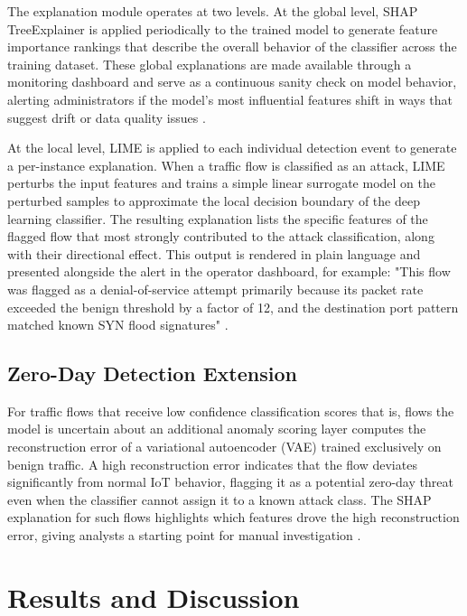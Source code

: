 \documentclass[a4paper,fleqn]{cas-dc}
\numberwithin{equation}{section}
\begin{document}
The explanation module operates at two levels. At the global level, SHAP TreeExplainer is applied periodically to the trained model to generate feature importance rankings that describe the overall behavior of the classifier across the training dataset. These global explanations are made available through a monitoring dashboard and serve as a continuous sanity check on model behavior, alerting administrators if the model's most influential features shift in ways that suggest drift or data quality issues \cite{ieee2024limeshap, ijcrt2025threat}.

At the local level, LIME is applied to each individual detection event to generate a per-instance explanation. When a traffic flow is classified as an attack, LIME perturbs the input features and trains a simple linear surrogate model on the perturbed samples to approximate the local decision boundary of the deep learning classifier. The resulting explanation lists the specific features of the flagged flow that most strongly contributed to the attack classification, along with their directional effect. This output is rendered in plain language and presented alongside the alert in the operator dashboard, for example: "This flow was flagged as a denial-of-service attempt primarily because its packet rate exceeded the benign threshold by a factor of 12, and the destination port pattern matched known SYN flood signatures" \cite{zolanvari2021transparent, aspg2025zeroday}.

\subsection{Zero-Day Detection Extension}

For traffic flows that receive low confidence classification scores that is, flows the model is uncertain about an additional anomaly scoring layer computes the reconstruction error of a variational autoencoder (VAE) trained exclusively on benign traffic. A high reconstruction error indicates that the flow deviates significantly from normal IoT behavior, flagging it as a potential zero-day threat even when the classifier cannot assign it to a known attack class. The SHAP explanation for such flows highlights which features drove the high reconstruction error, giving analysts a starting point for manual investigation \cite{aspg2025zeroday, nguyen2022explainable}.

\section{Results and Discussion}
\label{sec:results}
\end{document}
